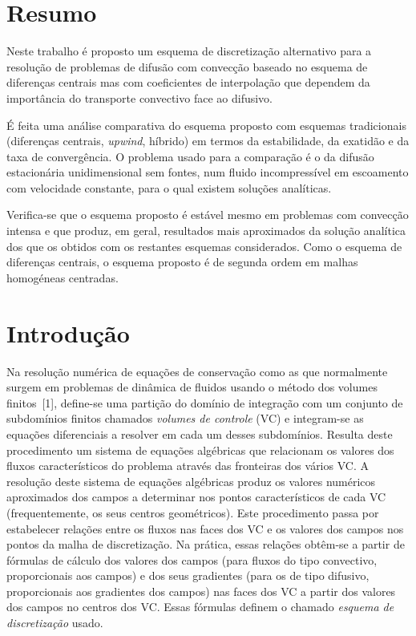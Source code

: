 \documentclass[11pt,twoside]{article}
\begin{document}
{\setlength{\parindent}{30pt}%

\small%
\section*{Resumo}
\smallskip
Neste trabalho é proposto um esquema de discretização alternativo para a
resolução de problemas de difusão com convecção baseado no esquema de diferenças
centrais mas com coeficientes de interpolação que dependem da importância do transporte
convectivo face ao difusivo.

É feita uma análise comparativa do esquema proposto com esquemas tradicionais
(diferenças centrais, \emph{upwind}, híbrido) em termos da estabilidade, da
exatidão e da taxa de convergência. O problema usado para a comparação é o da
difusão estacionária unidimensional sem fontes, num fluido incompressível em
escoamento com velocidade constante, para o qual existem soluções analíticas.

Verifica-se que o esquema proposto é estável mesmo em problemas com convecção
intensa e que produz, em geral, resultados mais aproximados da solução analítica
dos que os obtidos com os restantes esquemas considerados. Como o esquema de
diferenças centrais, o esquema proposto é de segunda ordem em malhas homogéneas
centradas.

\vspace{15pt}





\section{Introdução}
Na resolução numérica de equações de conservação como as que normalmente surgem em problemas de dinâmica de
fluidos usando o método dos volumes finitos~[1], define-se uma partição do domínio de integração com um conjunto de
subdomínios finitos chamados \emph{volumes de controle} (VC) e integram-se as equações diferenciais a resolver em
cada um desses subdomínios. Resulta deste
procedimento um sistema de equações algébricas que relacionam os valores dos
fluxos característicos do problema através das fronteiras dos vários VC. A
resolução deste sistema de equações algébricas produz os valores numéricos aproximados dos campos a determinar
nos pontos característicos de cada VC (frequentemente, os seus centros geométricos).  Este
procedimento passa por estabelecer relações entre os fluxos nas faces dos VC e os valores dos campos nos pontos da
malha de discretização. Na prática, essas relações obtêm-se a partir de fórmulas de cálculo dos valores dos campos
(para fluxos do tipo convectivo, proporcionais aos campos) e dos seus gradientes (para os de tipo difusivo,
proporcionais aos gradientes dos campos) nas faces dos VC a partir dos valores dos campos no centros dos VC. Essas fórmulas definem o chamado \emph{esquema de discretização} usado.

}
\end{document}
